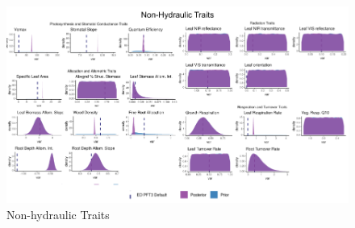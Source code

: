 \begin{figure}[h]
    \centering
    \includegraphics[width=.95\textwidth]{Hydro_Paper_LaTeX/Hydro_Paper_Figures/non_hydraulic_traits.png}
    \caption[Non-hydraulic Traits]{Non-hydraulic Traits}
    \label{fig:non_hydraulic_traits}
\end{figure}